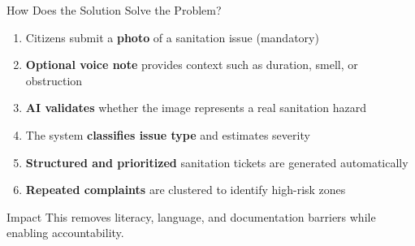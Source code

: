 \documentclass[aspectratio=169]{beamer}
\begin{document}
\begin{frame}{How Does the Solution Solve the Problem?}

\begin{enumerate}
    \item Citizens submit a \textbf{photo} of a sanitation issue (mandatory)
    \vspace{0.3cm}
    \item \textbf{Optional voice note} provides context such as duration, smell, or obstruction
    \vspace{0.3cm}
    \item \textbf{AI validates} whether the image represents a real sanitation hazard
    \vspace{0.3cm}
    \item The system \textbf{classifies issue type} and estimates severity
    \vspace{0.3cm}
    \item \textbf{Structured and prioritized} sanitation tickets are generated automatically
    \vspace{0.3cm}
    \item \textbf{Repeated complaints} are clustered to identify high-risk zones
\end{enumerate}

\vspace{0.3cm}

\begin{block}{Impact}
This removes literacy, language, and documentation barriers while enabling accountability.
\end{block}

\end{frame}
\end{document}
